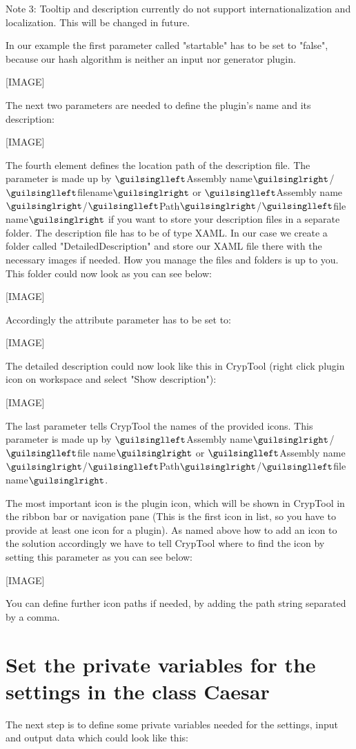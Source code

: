 Note 3: Tooltip and description currently do not support internationalization and localization. This will be changed in future.

In our example the first parameter called "startable" has to be set to "false", because our hash algorithm is neither an input nor generator plugin.

[IMAGE]

The next two parameters are needed to define the plugin's name and its description:

[IMAGE]

The fourth element defines the location path of the description file. The parameter is made up by $\guilsinglleft$Assembly name$\guilsinglright$/$\guilsinglleft$filename$\guilsinglright$ or $\guilsinglleft$Assembly name$\guilsinglright$/$\guilsinglleft$Path$\guilsinglright$/$\guilsinglleft$file name$\guilsinglright$ if you want to store your description files in a separate folder. The description file has to be of type XAML. In our case we create a folder called "DetailedDescription" and store our XAML file there with the necessary images if needed. How you manage the files and folders is up to you. This folder could now look as you can see below:

[IMAGE]

Accordingly the attribute parameter has to be set to:

[IMAGE]

The detailed description could now look like this in CrypTool (right click plugin icon on workspace and select "Show description"):

[IMAGE]

The last parameter tells CrypTool the names of the provided icons. This parameter is made up by $\guilsinglleft$Assembly name$\guilsinglright$/$\guilsinglleft$file name$\guilsinglright$ or $\guilsinglleft$Assembly name$\guilsinglright$/$\guilsinglleft$Path$\guilsinglright$/$\guilsinglleft$file name$\guilsinglright$.

The most important icon is the plugin icon, which will be shown in CrypTool in the ribbon bar or navigation pane (This is the first icon in list, so you have to provide at least one icon for a plugin). As named above how to add an icon to the solution accordingly we have to tell CrypTool where to find the icon by setting this parameter as you can see below:

[IMAGE]

You can define further icon paths if needed, by adding the path string separated by a comma.
\section{Set the private variables for the settings in the class Caesar}
\label{sec:SetThePrivateVariablesForTheSettingsInTheClassMD5}
The next step is to define some private variables needed for the settings, input and output data which could look like this:

